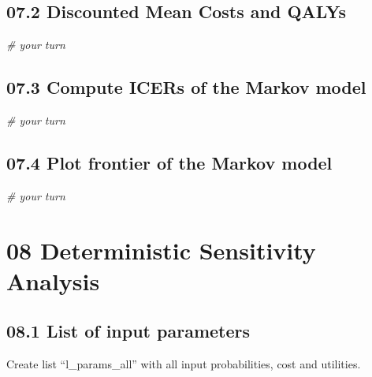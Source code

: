 \documentclass[]{article}
\newenvironment{Shaded}{\begin{snugshade}}{\end{snugshade}}
\newcommand{\CommentTok}[1]{\textcolor[rgb]{0.56,0.35,0.01}{\textit{#1}}}
\begin{document}
\subsection{07.2 Discounted Mean Costs and
QALYs}\label{discounted-mean-costs-and-qalys}

\begin{Shaded}
\begin{Highlighting}[]
\CommentTok{# your turn}
\end{Highlighting}
\end{Shaded}

\subsection{07.3 Compute ICERs of the Markov
model}\label{compute-icers-of-the-markov-model}

\begin{Shaded}
\begin{Highlighting}[]
\CommentTok{# your turn}
\end{Highlighting}
\end{Shaded}

\subsection{07.4 Plot frontier of the Markov
model}\label{plot-frontier-of-the-markov-model}

\begin{Shaded}
\begin{Highlighting}[]
\CommentTok{# your turn}
\end{Highlighting}
\end{Shaded}

\section{08 Deterministic Sensitivity
Analysis}\label{deterministic-sensitivity-analysis}

\subsection{08.1 List of input
parameters}\label{list-of-input-parameters}

Create list ``l\_params\_all'' with all input probabilities, cost and
utilities.
\end{document}
